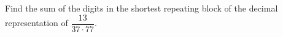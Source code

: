 Find the sum of the digits in the shortest repeating block of the decimal representation of $\dfrac{13}{37\cdot77}$.
